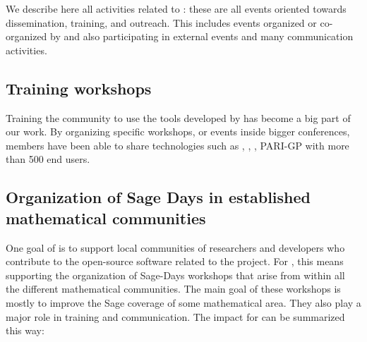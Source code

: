 \documentclass{deliverablereport}
\begin{document}
We describe here all activities related to :
these are all events oriented towards dissemination, training, and outreach. This
includes events organized or co-organized by \ODK and also
participating in external events and many communication activities.

\subsection{Training workshops}

Training the community to use the tools developed by \ODK has become a big 
part of our work. By organizing specific workshops, or events inside bigger
conferences, \ODK members have been able to share \ODK technologies such as \Jupyter,
\Sage, \GAP, PARI-GP with more than 500 end users.





























\subsection{Organization of Sage Days in established mathematical communities}

One goal of \ODK is to support local communities of researchers
and developers who contribute to the open-source software related to
the project. For \Sage, this means supporting the organization of Sage-Days
workshops that arise from within all the different mathematical communities. The main 
goal of these workshops is mostly to improve the Sage coverage of some mathematical
area. They also play a major role in training and communication. The
impact for \ODK can be summarized this way:
\end{document}
